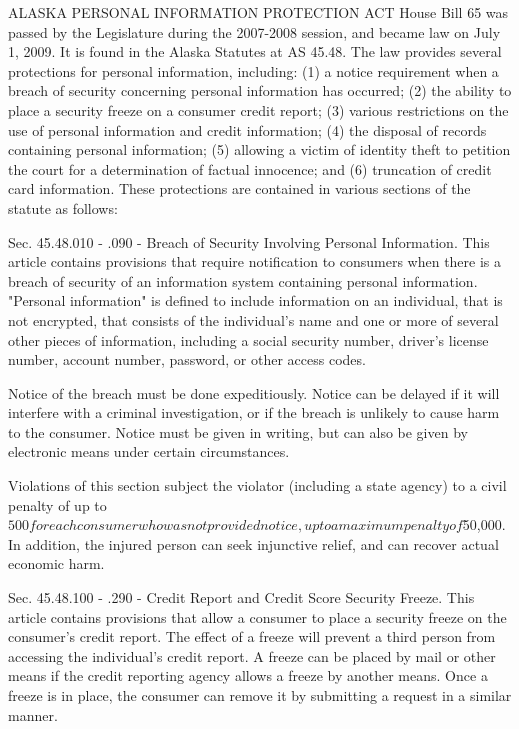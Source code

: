 ALASKA PERSONAL INFORMATION PROTECTION ACT
House Bill 65 was passed by the Legislature during the 2007-2008 session, and became law on July 1, 2009.  It is found in the Alaska Statutes at AS 45.48. The law provides several protections for personal information, including: (1) a notice requirement when a breach of security concerning personal information has occurred; (2) the ability to place a security freeze on a consumer credit report; (3) various restrictions on the use of personal information and credit information; (4) the disposal of records containing personal information; (5) allowing a victim of identity theft to petition the court for a determination of factual innocence; and (6) truncation of credit card information.  These protections are contained in various sections of the statute as follows:

Sec. 45.48.010 - .090 - Breach of
Security Involving Personal Information.
This article contains provisions that require notification to consumers when there is a breach of security of an information system containing personal information.  "Personal information" is defined to include information on an individual, that is not encrypted, that consists of the individual's name and one or more of several other pieces of information, including a social security number, driver's license number, account number, password, or other access codes.

Notice of the breach must be done expeditiously.  Notice can be delayed if it will interfere with a criminal investigation, or if the breach is unlikely to cause harm to the consumer.  Notice must be given in writing, but can also be given by electronic means under certain circumstances.

Violations of this section subject the violator (including a state agency) to a civil penalty of up to $500 for each consumer who was not provided notice, up to a maximum penalty of $50,000.  In addition, the injured person can seek injunctive relief, and can recover actual economic harm.

Sec. 45.48.100 - .290 - Credit Report and
Credit Score Security Freeze.
This article contains provisions that allow a consumer to place a security freeze on the consumer's credit report.  The effect of a freeze will prevent a third person from accessing the individual's credit report.  A freeze can be placed by mail or other means if the credit reporting agency allows a freeze by another means.  Once a freeze is in place, the consumer can remove it by submitting a request in a similar manner.


